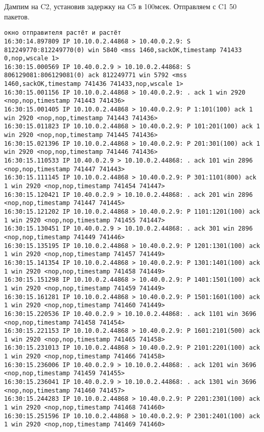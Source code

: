 \documentclass[a4paper,12pt]{article}
\begin{document}
Дампим на C2, установив задержку на C5 в 100мсек. Отправляем с C1 50 пакетов.
\begin{Verbatim}
окно отправителя растёт и растёт
16:30:14.897809 IP 10.10.0.2.44868 > 10.40.0.2.9: S 812249770:812249770(0) win 5840 <mss 1460,sackOK,timestamp 741433 0,nop,wscale 1>
16:30:15.000569 IP 10.40.0.2.9 > 10.10.0.2.44868: S 806129081:806129081(0) ack 812249771 win 5792 <mss 1460,sackOK,timestamp 741436 741433,nop,wscale 1>
16:30:15.001156 IP 10.10.0.2.44868 > 10.40.0.2.9: . ack 1 win 2920 <nop,nop,timestamp 741443 741436>
16:30:15.001405 IP 10.10.0.2.44868 > 10.40.0.2.9: P 1:101(100) ack 1 win 2920 <nop,nop,timestamp 741443 741436>
16:30:15.011823 IP 10.10.0.2.44868 > 10.40.0.2.9: P 101:201(100) ack 1 win 2920 <nop,nop,timestamp 741445 741436>
16:30:15.021396 IP 10.10.0.2.44868 > 10.40.0.2.9: P 201:301(100) ack 1 win 2920 <nop,nop,timestamp 741446 741436>
16:30:15.110533 IP 10.40.0.2.9 > 10.10.0.2.44868: . ack 101 win 2896 <nop,nop,timestamp 741447 741443>
16:30:15.111145 IP 10.10.0.2.44868 > 10.40.0.2.9: P 301:1101(800) ack 1 win 2920 <nop,nop,timestamp 741454 741447>
16:30:15.120421 IP 10.40.0.2.9 > 10.10.0.2.44868: . ack 201 win 2896 <nop,nop,timestamp 741447 741445>
16:30:15.121202 IP 10.10.0.2.44868 > 10.40.0.2.9: P 1101:1201(100) ack 1 win 2920 <nop,nop,timestamp 741455 741447>
16:30:15.130451 IP 10.40.0.2.9 > 10.10.0.2.44868: . ack 301 win 2896 <nop,nop,timestamp 741449 741446>
16:30:15.135195 IP 10.10.0.2.44868 > 10.40.0.2.9: P 1201:1301(100) ack 1 win 2920 <nop,nop,timestamp 741457 741449>
16:30:15.141354 IP 10.10.0.2.44868 > 10.40.0.2.9: P 1301:1401(100) ack 1 win 2920 <nop,nop,timestamp 741458 741449>
16:30:15.151298 IP 10.10.0.2.44868 > 10.40.0.2.9: P 1401:1501(100) ack 1 win 2920 <nop,nop,timestamp 741459 741449>
16:30:15.161281 IP 10.10.0.2.44868 > 10.40.0.2.9: P 1501:1601(100) ack 1 win 2920 <nop,nop,timestamp 741460 741449>
16:30:15.220536 IP 10.40.0.2.9 > 10.10.0.2.44868: . ack 1101 win 3696 <nop,nop,timestamp 741458 741454>
16:30:15.221153 IP 10.10.0.2.44868 > 10.40.0.2.9: P 1601:2101(500) ack 1 win 2920 <nop,nop,timestamp 741465 741458>
16:30:15.231013 IP 10.10.0.2.44868 > 10.40.0.2.9: P 2101:2201(100) ack 1 win 2920 <nop,nop,timestamp 741466 741458>
16:30:15.236006 IP 10.40.0.2.9 > 10.10.0.2.44868: . ack 1201 win 3696 <nop,nop,timestamp 741459 741455>
16:30:15.236041 IP 10.40.0.2.9 > 10.10.0.2.44868: . ack 1301 win 3696 <nop,nop,timestamp 741460 741457>
16:30:15.244283 IP 10.10.0.2.44868 > 10.40.0.2.9: P 2201:2301(100) ack 1 win 2920 <nop,nop,timestamp 741468 741460>
16:30:15.251596 IP 10.10.0.2.44868 > 10.40.0.2.9: P 2301:2401(100) ack 1 win 2920 <nop,nop,timestamp 741469 741460>

\end{Verbatim}
\end{document}
